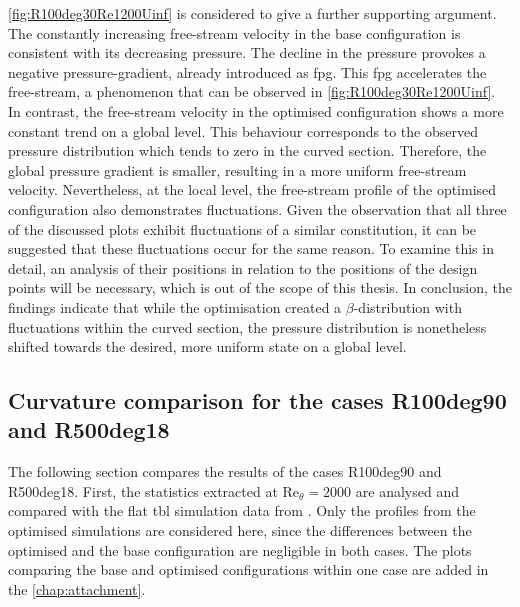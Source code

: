 \autoref{fig:R100deg30Re1200Uinf} is considered to give a further supporting argument.
The constantly increasing free-stream velocity in the base configuration is consistent with its decreasing pressure.
The decline in the pressure provokes a negative pressure-gradient, already introduced as \acrshort{fpg}.
This \acrshort{fpg} accelerates the free-stream, a phenomenon that can be observed in \autoref{fig:R100deg30Re1200Uinf}.
In contrast, the free-stream velocity in the optimised configuration shows a more constant trend on a global level.
This behaviour corresponds to the observed pressure distribution which tends to zero in the curved section.
Therefore, the global pressure gradient is smaller, resulting in a more uniform free-stream velocity.
Nevertheless, at the local level, the free-stream profile of the optimised configuration also demonstrates fluctuations.
Given the observation that all three of the discussed plots exhibit fluctuations of a similar constitution, it can be suggested that these fluctuations occur for the same reason.
To examine this in detail, an analysis of their positions in relation to the positions of the design points will be necessary, which is out of the scope of this thesis.
In conclusion, the findings indicate that while the optimisation created a $\beta$-distribution with fluctuations within the curved section, the pressure distribution is nonetheless shifted towards the desired, more uniform state on a global level.

\newpage

\subsection{Curvature comparison for the cases R100deg90 and R500deg18}

The following section compares the results of the cases R100deg90 and R500deg18.
First, the statistics extracted at $\mathrm{Re}_{\theta}=2000$ are analysed and compared with the flat \acrshort{tbl} simulation data from \citet{schlatter_assessment_2010}.
Only the profiles from the optimised simulations are considered here, since the differences between the optimised and the base configuration are negligible in both cases.
The plots comparing the base and optimised configurations within one case are added in the \autoref{chap:attachment}.

